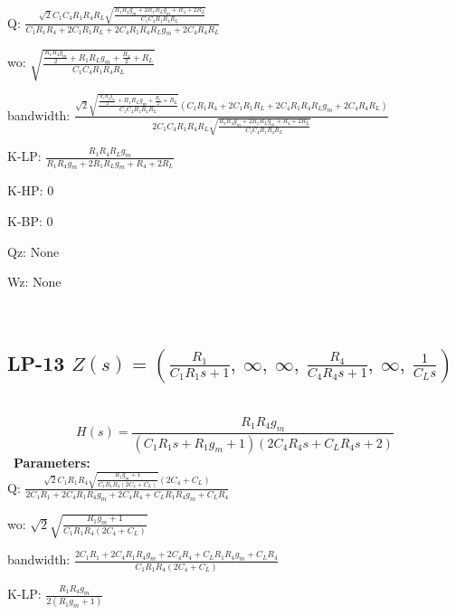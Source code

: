 \documentclass{article}
\begin{document}
Q: $\frac{\sqrt{2} C_{1} C_{4} R_{1} R_{4} R_{L} \sqrt{\frac{R_{1} R_{4} g_{m} + 2 R_{1} R_{L} g_{m} + R_{4} + 2 R_{L}}{C_{1} C_{4} R_{1} R_{4} R_{L}}}}{C_{1} R_{1} R_{4} + 2 C_{1} R_{1} R_{L} + 2 C_{4} R_{1} R_{4} R_{L} g_{m} + 2 C_{4} R_{4} R_{L}}$\ 

wo: $\sqrt{\frac{\frac{R_{1} R_{4} g_{m}}{2} + R_{1} R_{L} g_{m} + \frac{R_{4}}{2} + R_{L}}{C_{1} C_{4} R_{1} R_{4} R_{L}}}$\ 

bandwidth: $\frac{\sqrt{2} \sqrt{\frac{\frac{R_{1} R_{4} g_{m}}{2} + R_{1} R_{L} g_{m} + \frac{R_{4}}{2} + R_{L}}{C_{1} C_{4} R_{1} R_{4} R_{L}}} \left(C_{1} R_{1} R_{4} + 2 C_{1} R_{1} R_{L} + 2 C_{4} R_{1} R_{4} R_{L} g_{m} + 2 C_{4} R_{4} R_{L}\right)}{2 C_{1} C_{4} R_{1} R_{4} R_{L} \sqrt{\frac{R_{1} R_{4} g_{m} + 2 R_{1} R_{L} g_{m} + R_{4} + 2 R_{L}}{C_{1} C_{4} R_{1} R_{4} R_{L}}}}$\ 

K-LP: $\frac{R_{1} R_{4} R_{L} g_{m}}{R_{1} R_{4} g_{m} + 2 R_{1} R_{L} g_{m} + R_{4} + 2 R_{L}}$\ 

K-HP: $0$\ 

K-BP: $0$\ 

Qz: $\text{None}$\ 

Wz: $\text{None}$\ 

\ 

\subsection{LP-13 $Z(s) = \left( \frac{R_{1}}{C_{1} R_{1} s + 1}, \  \infty, \  \infty, \  \frac{R_{4}}{C_{4} R_{4} s + 1}, \  \infty, \  \frac{1}{C_{L} s}\right)$ } \ 
\textbf{\[H(s) = \frac{R_{1} R_{4} g_{m}}{\left(C_{1} R_{1} s + R_{1} g_{m} + 1\right) \left(2 C_{4} R_{4} s + C_{L} R_{4} s + 2\right)}\] } \ 
\textbf{Parameters:}\\ 

Q: $\frac{\sqrt{2} C_{1} R_{1} R_{4} \sqrt{\frac{R_{1} g_{m} + 1}{C_{1} R_{1} R_{4} \left(2 C_{4} + C_{L}\right)}} \left(2 C_{4} + C_{L}\right)}{2 C_{1} R_{1} + 2 C_{4} R_{1} R_{4} g_{m} + 2 C_{4} R_{4} + C_{L} R_{1} R_{4} g_{m} + C_{L} R_{4}}$\ 

wo: $\sqrt{2} \sqrt{\frac{R_{1} g_{m} + 1}{C_{1} R_{1} R_{4} \left(2 C_{4} + C_{L}\right)}}$\ 

bandwidth: $\frac{2 C_{1} R_{1} + 2 C_{4} R_{1} R_{4} g_{m} + 2 C_{4} R_{4} + C_{L} R_{1} R_{4} g_{m} + C_{L} R_{4}}{C_{1} R_{1} R_{4} \left(2 C_{4} + C_{L}\right)}$\ 

K-LP: $\frac{R_{1} R_{4} g_{m}}{2 \left(R_{1} g_{m} + 1\right)}$\ 
\end{document}
